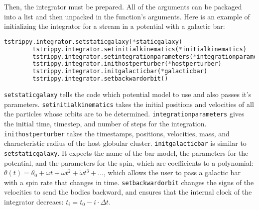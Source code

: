 \documentclass{article}
\begin{document}
    Then, the integrator must be prepared. All of the arguments can be packaged into a list and then unpacked in the function's arguments. Here is an example of initializing the integrator for a stream in a potential with a galactic bar:
    \small
    \begin{lstlisting}[language=python]
        tstrippy.integrator.setstaticgalaxy(*staticgalaxy)
        tstrippy.integrator.setinitialkinematics(*initialkinematics)
        tstrippy.integrator.setintegrationparameters(*integrationparameters)
        tstrippy.integrator.inithostperturber(*hostperturber)
        tstrippy.integrator.initgalacticbar(*galacticbar)
        tstrippy.integrator.setbackwardorbit()
    \end{lstlisting}
    \normalsize
    \texttt{setstaticgalaxy} tells the code which potential model to use and also passes it's parameters. \texttt{setinitialkinematics} takes the initial positions and velocities of all the particles whose orbits are to be determined. \texttt{integrationparameters} gives the initial time, timestep, and number of steps for the integration. \texttt{inithostperturber} takes the timestamps, positions, velocities, mass, and characteristic radius of the host globular cluster. \texttt{initgalacticbar} is similar to \texttt{setstaticgalaxy}. It expects the name of the bar model, the parameters for the potential, and the parameters for the spin, which are coefficients to a polynomial: $\theta(t) = \theta_0 + \omega t + \dot{\omega}t^2 + \ddot{\omega}t^3 + \dots$, which allows the user to pass a galactic bar with a spin rate that changes in time. \texttt{setbackwardorbit} changes the signs of the velocities to send the bodies backward, and ensures that the internal clock of the integrator decreaes: $t_{i}= t_0 - i\cdot\Delta t$.  
\end{document}
